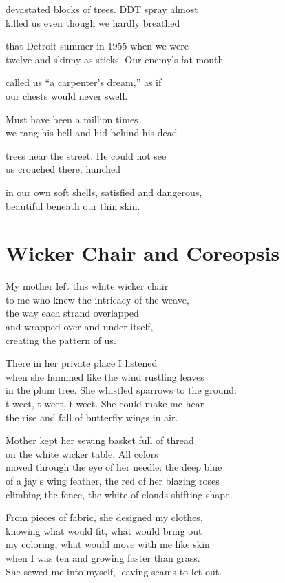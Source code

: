 \documentclass[twoside,10pt]{book}
\begin{document}
devastated blocks of trees. DDT spray almost\\
killed us even though we hardly breathed

that Detroit summer in 1955 when we were\\
twelve and skinny as sticks. Our enemy's fat mouth

called us ``a carpenter's dream,'' as if\\
our chests would never swell.

Must have been a million times\\
we rang his bell and hid behind his dead

trees near the street. He could not see\\
us crouched there, hunched

in our own soft shells, satisfied and dangerous,\\
beautiful beneath our thin skin.


\clearpage
\section{Wicker Chair and Coreopsis}

My mother left this white wicker chair\\
to me who knew the intricacy of the weave,\\
the way each strand overlapped\\
and wrapped over and under itself,\\
creating the pattern of us.

There in her private place I listened\\
when she hummed like the wind rustling leaves\\
in the plum tree. She whistled sparrows to the ground:\\
t-weet, t-weet, t-weet. She could make me hear\\
the rise and fall of butterfly wings in air.

Mother kept her sewing basket full of thread\\
on the white wicker table. All colors\\
moved through the eye of her needle: the deep blue\\
of a jay's wing feather, the red of her blazing roses\\
climbing the fence, the white of clouds shifting shape.

From pieces of fabric, she designed my clothes,\\
knowing what would fit, what would bring out\\
my coloring, what would move with me like skin\\
when I was ten and growing faster than grass.\\
She sewed me into myself, leaving seams to let out.
\end{document}
